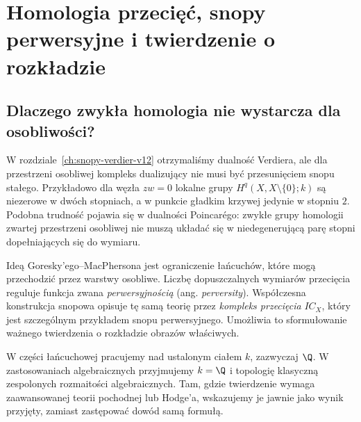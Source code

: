 \chapter{Homologia przecięć, snopy perwersyjne i twierdzenie o rozkładzie}
\label{ch:ih-perverse-xiii}

\section{Dlaczego zwykła homologia nie wystarcza dla osobliwości?}
W rozdziale~\ref{ch:snopy-verdier-v12} otrzymaliśmy dualność Verdiera,
ale dla przestrzeni osobliwej kompleks dualizujący nie musi być
przesunięciem snopu stałego. Przykładowo dla węzła $zw=0$
lokalne grupy $H^q(X,X\setminus\{0\};k)$ są niezerowe w dwóch
stopniach, a w punkcie gładkim krzywej jedynie w stopniu $2$.
Podobna trudność pojawia się w dualności Poincarégo: zwykłe grupy
homologii zwartej przestrzeni osobliwej nie muszą układać się w
niedegenerującą parę stopni dopełniających się do wymiaru.

Ideą Goresky'ego--MacPhersona jest ograniczenie łańcuchów, które
mogą przechodzić przez warstwy osobliwe. Liczbę dopuszczalnych
wymiarów przecięcia reguluje funkcja zwana
\emph{perwersyjnością} (ang. \emph{perversity}).
Współczesna konstrukcja snopowa opisuje tę samą teorię przez
\emph{kompleks przecięcia} $IC_X$, który jest szczególnym
przykładem snopu perwersyjnego. Umożliwia to sformułowanie
ważnego twierdzenia o rozkładzie obrazów właściwych.

W części łańcuchowej pracujemy nad ustalonym ciałem $k$,
zazwyczaj $\Q$. W zastosowaniach algebraicznych
przyjmujemy $k=\Q$ i topologię klasyczną zespolonych
rozmaitości algebraicznych. Tam, gdzie twierdzenie wymaga
zaawansowanej teorii pochodnej lub Hodge'a, wskazujemy je
jawnie jako wynik przyjęty, zamiast zastępować dowód samą
formułą.

